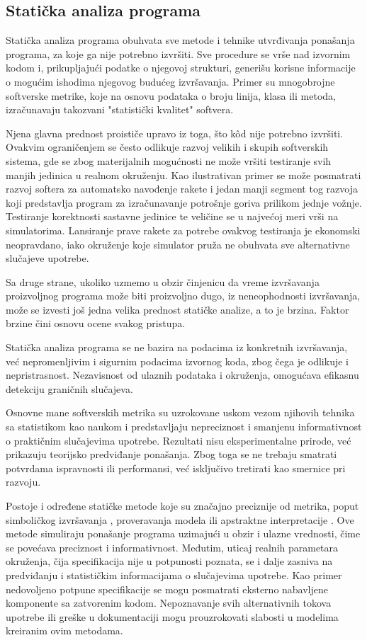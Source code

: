 \documentclass[12pt,oneside]{memoir}
\begin{document}
\subsection{Statička analiza programa}

Statička analiza programa \cite{Static} obuhvata sve metode i tehnike utvrđivanja ponašanja programa, za koje ga nije potrebno izvršiti. Sve procedure se vrše nad izvornim kodom i, prikupljajući podatke o njegovoj strukturi, generišu korisne informacije o mogućim ishodima njegovog budućeg izvršavanja. Primer su mnogobrojne softverske metrike, koje na osnovu podataka o broju linija, klasa ili metoda, izračunavaju takozvani "statistički kvalitet" softvera. 

Njena glavna prednost proističe upravo iz toga, što k\^{o}d nije potrebno izvršiti. Ovakvim ograničenjem se često odlikuje razvoj velikih i skupih softverskih sistema, gde se zbog materijalnih mogućnosti ne može vršiti testiranje svih manjih jedinica u realnom okruženju. Kao ilustrativan primer se može posmatrati razvoj softera za automatsko navođenje rakete i jedan manji segment tog razvoja koji predstavlja program za izračunavanje potrošnje goriva prilikom jednje vožnje. Testiranje korektnosti sastavne jedinice te veličine se u najvećoj meri vrši na simulatorima. Lansiranje prave rakete za potrebe ovakvog testiranja je ekonomski neopravdano, iako okruženje koje simulator pruža ne obuhvata sve alternativne slučajeve upotrebe. 

Sa druge strane, ukoliko uzmemo u obzir činjenicu da vreme izvršavanja proizvoljnog programa može biti proizvoljno dugo, iz neneophodnosti izvršavanja, može se izvesti još jedna velika prednost statičke analize, a to je brzina. Faktor brzine čini osnovu ocene svakog pristupa.

Statička analiza programa se ne bazira na podacima iz konkretnih izvršavanja, već nepromenljivim i sigurnim podacima izvornog koda, zbog čega je odlikuje i nepristrasnost. Nezavisnost od ulaznih podataka i okruženja, omogućava efikasnu detekciju graničnih slučajeva.
 
Osnovne mane softverskih metrika su uzrokovane uskom vezom njihovih tehnika sa statistikom kao naukom i predstavljaju nepreciznost i smanjenu informativnost o praktičnim slučajevima upotrebe. Rezultati nisu eksperimentalne prirode, već prikazuju teorijsko predviđanje ponašanja. Zbog toga se ne trebaju smatrati potvrdama ispravnosti ili performansi, već isključivo tretirati kao smernice pri razvoju.

Postoje i određene statičke metode koje su značajno preciznije od metrika, poput simboličkog izvršavanja \cite{Simbolicko}, proveravanja modela \cite{TestModel} ili apstraktne interpretacije \cite{Apstraktno}. Ove metode simuliraju ponašanje programa uzimajući u obzir i ulazne vrednosti, čime se povećava preciznost i informativnost. Međutim, uticaj realnih parametara okruženja, čija specifikacija nije u potpunosti poznata, se i dalje zasniva na predviđanju i statističkim informacijama o slučajevima upotrebe. Kao primer nedovoljeno potpune specifikacije se mogu posmatrati eksterno nabavljene komponente sa zatvorenim kodom. Nepoznavanje svih alternativnih tokova upotrebe ili greške u dokumentaciji mogu prouzrokovati slabosti u modelima kreiranim ovim metodama.
\end{document}
